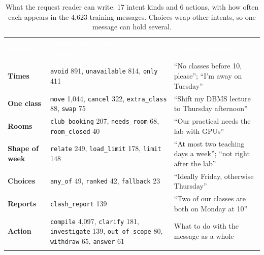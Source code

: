\documentclass[10pt,a4paper]{article}
\renewcommand{\arraystretch}{1.2}
\newcommand{\hdr}{\rowcolor{secblue}}
\newcommand{\hd}[1]{\textcolor{white}{\textbf{#1}}}
\begin{document}
\begin{table}[H]
\centering\footnotesize
\renewcommand{\arraystretch}{1.3}
\setlength{\tabcolsep}{5pt}
\begin{tabularx}{\textwidth}{l p{6.3cm} X}
\arrayrulecolor{secblue}\toprule\arrayrulecolor{black}
\hdr \hd{Group} & \hd{Intent kinds (times used in training)} & \hd{Example message}\\
\arrayrulecolor{secblue}\midrule\arrayrulecolor{black}
\textbf{\textcolor{secblue}{Times}} & \texttt{avoid} 891, \texttt{unavailable} 814, \texttt{only} 411 & ``No classes before 10, please''; ``I'm away on Tuesday''\\
\textbf{\textcolor{secblue}{One class}} & \texttt{move} 1{,}044, \texttt{cancel} 322, \texttt{extra\_class} 88, \texttt{swap} 75 & ``Shift my DBMS lecture to Thursday afternoon''\\
\textbf{\textcolor{secblue}{Rooms}} & \texttt{club\_booking} 207, \texttt{needs\_room} 68, \texttt{room\_closed} 40 & ``Our practical needs the lab with GPUs''\\
\textbf{\textcolor{secblue}{Shape of week}} & \texttt{relate} 249, \texttt{load\_limit} 178, \texttt{limit} 148 & ``At most two teaching days a week''; ``not right after the lab''\\
\textbf{\textcolor{secblue}{Choices}} & \texttt{any\_of} 49, \texttt{ranked} 42, \texttt{fallback} 23 & ``Ideally Friday, otherwise Thursday''\\
\textbf{\textcolor{secblue}{Reports}} & \texttt{clash\_report} 139 & ``Two of our classes are both on Monday at 10''\\
\arrayrulecolor{black!25}\midrule\arrayrulecolor{black}
\textbf{\textcolor{secblue}{Action}} & \texttt{compile} 4{,}097, \texttt{clarify} 181, \texttt{investigate} 139, \texttt{out\_of\_scope} 80, \texttt{withdraw} 65, \texttt{answer} 61 & What to do with the message as a whole\\
\arrayrulecolor{secblue}\bottomrule\arrayrulecolor{black}
\end{tabularx}
\caption{What the request reader can write: 17 intent kinds and 6 actions, with how often each appears in the
4{,}623 training messages. Choices wrap other intents, so one message can hold several.}
\label{tab:intents}
\end{table}
\end{document}
